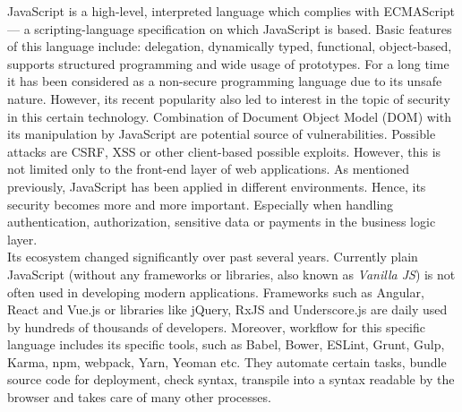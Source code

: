 \documentclass{article} %
\begin{document}
JavaScript is a high-level, interpreted language which complies with ECMAScript --- a scripting-language specification on which JavaScript is based. Basic features of this language include: delegation, dynamically typed, functional, object-based, supports structured programming and wide usage of prototypes. For a long time it has been considered as a non-secure programming language due to its unsafe nature. However, its recent popularity also led to interest in the topic of security in this certain technology. Combination of Document Object Model (DOM) with its manipulation by JavaScript are potential source of vulnerabilities. Possible attacks are CSRF, XSS or other client-based possible exploits. However, this is not limited only to the front-end layer of web applications. As mentioned previously, JavaScript has been applied in different environments. Hence, its security becomes more and more important. Especially when handling authentication, authorization, sensitive data or payments in the business logic layer.\\
\newline
Its ecosystem changed significantly over past several years. Currently plain JavaScript (without any frameworks or libraries, also known as \textit{Vanilla JS}) is not often used in developing modern applications. Frameworks such as Angular, React and Vue.js or libraries like jQuery, RxJS and Underscore.js are daily used by hundreds of thousands of developers. Moreover, workflow for this specific language includes its specific tools, such as Babel, Bower, ESLint, Grunt, Gulp, Karma, npm, webpack, Yarn, Yeoman etc. They automate certain tasks, bundle source code for deployment, check syntax, transpile into a syntax readable by the browser and takes care of many other processes.
\end{document}
